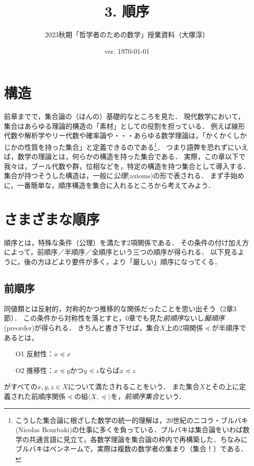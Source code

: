 \documentclass[11pt,a4paper]{jsarticle}
\begin{document}
\title{3. 順序}
\author{2023秋期「哲学者のための数学」授業資料（大塚淳）}
\date{ver. \today}
\maketitle

\section{構造}
前章までで，集合論の（ほんの）基礎的なところを見た．
現代数学において，集合はあらゆる理論的構造の「素材」としての役割を担っている．
例えば線形代数や解析学やリー代数や確率論や・・・あらゆる数学理論は，「かくかくしかじかの性質を持った集合」と定義できるのである\footnote{こうした集合論に根ざした数学の統一的理解は，20世紀のニコラ・ブルバキ(Nicolas Bourbaki)の仕事に多くを負っている．ブルバキは集合論をいわば数学の共通言語に見立て，各数学理論を集合論の枠内で再構築した．ちなみにブルバキはペンネームで，実際は複数の数学者の集まり（集合！）である．}．
つまり語弊を恐れずにいえば，数学の理論とは，何らかの構造を持った集合である．
実際，この章以下で我々は，ブール代数や群，位相などを，特定の構造を持つ集合として導入する．
集合が持つそうした構造は，一般に\emph{公理}(axioms)の形で表される．
まず手始めに，一番簡単な，順序構造を集合に入れるところから考えてみよう．


\section{さまざまな順序}
順序とは，特殊な条件（公理）を満たす2項関係である．
その条件の付け加え方によって，前順序／半順序／全順序という三つの順序が得られる．
以下見るように，後の方ほどより要件が多く，より「厳しい」順序になってくる．


\subsection{前順序}
同値類とは反射的，対称的かつ推移的な関係だったことを思い出そう（2章3節）．
この条件から対称性を落とすと，0章でも見た\emph{前順序}ないし\emph{擬順序}(preorder)が得られる．
きちんと書き下せば，集合$X$上の2項関係$\preceq$が半順序であるとは，
\begin{itemize}
 \item[O1] 反射性：$x \preceq x$
 \item[O2] 推移性：$x \preceq y$かつ$y \preceq z$ならば$x \preceq z$
\end{itemize}
がすべての$x, y, z\in X$について満たされることをいう．
また集合$X$とその上に定義された前順序関係$\preceq$の組$\langle X, \preceq \rangle$を，\emph{前順序集合}という．
\end{document}
